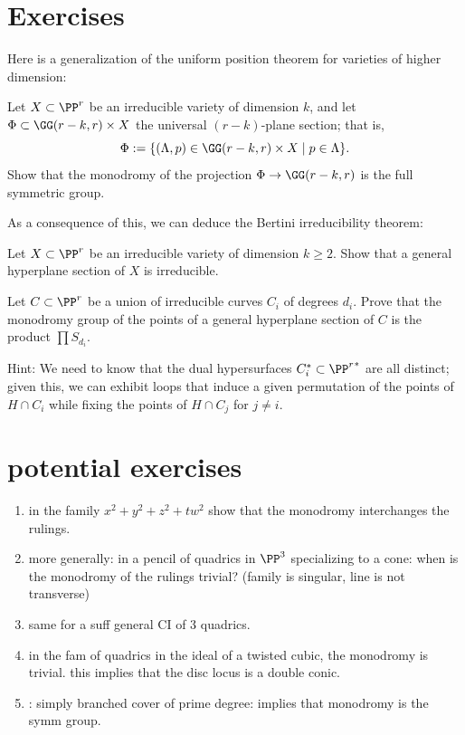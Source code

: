 \section{Exercises}

Here is a generalization of the uniform position theorem for varieties of higher dimension:

\begin{exercise}
Let $X \subset \PP^r$ be an irreducible variety of dimension $k$, and let $\Phi \subset \GG(r-k, r) \times X$ the universal $(r-k)$-plane section; that is,
$$
\Phi := \{ (\Lambda, p) \in \GG(r-k,r) \times X \mid p \in \Lambda \}.
$$
Show that the monodromy of the projection $\Phi \to \GG(r-k,r)$ is the full symmetric group.
\end{exercise}

As a consequence of this, we can deduce the Bertini irreducibility theorem:

\begin{exercise}
Let $X \subset \PP^r$ be an irreducible variety of dimension $k \geq 2$. Show that a general hyperplane section of $X$ is irreducible.
\end{exercise}

\begin{exercise}
Let $C \subset \PP^r$ be a union of irreducible curves $C_i$ of degrees $d_i$. Prove that the monodromy group of the points of a general hyperplane section of $C$ is the product $\prod S_{d_i}$.
\end{exercise}

Hint: We need to know that the dual hypersurfaces $C_i^* \subset {\PP^r}^*$ are all distinct; given this, we can exhibit loops that induce a given permutation of the points of $H \cap C_i$ while fixing the points of $H \cap C_j$ for $j \neq i$.

\section{potential exercises}
\begin{enumerate}
 \item in the family $x^2+y^2 +z^2+tw^2$ show that the monodromy interchanges the rulings.
 \item more generally: in a pencil of quadrics in $\PP^3$ specializing to a cone: when is the monodromy of the rulings trivial? (family is singular, line is not transverse)
 \item same for a suff general CI of 3 quadrics.
 \item in the fam of quadrics in the ideal of a twisted cubic, the monodromy is trivial. this implies that the disc locus is a double conic.
 \item: simply branched cover of prime degree: implies that monodromy is the symm group.
 
\end{enumerate}



